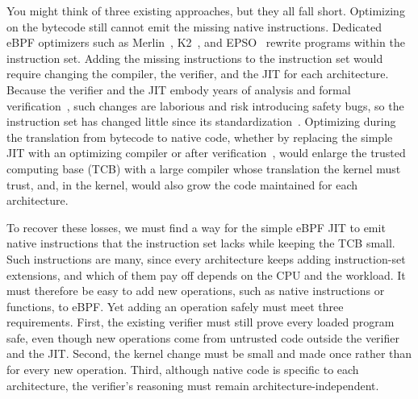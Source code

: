 You might think of three existing approaches, but they all fall short.
Optimizing on the bytecode still cannot emit the missing native instructions. Dedicated eBPF optimizers such as Merlin~\cite{mao2024merlin}, K2~\cite{xu2021synthesizing}, and EPSO~\cite{zhu2025epso} rewrite programs within the instruction set.
Adding the missing instructions to the instruction set would require changing the compiler, the verifier, and the JIT for each architecture. Because the verifier and the JIT embody years of analysis and formal verification~\cite{nelson2020specification,vishwanathan2023verifying}, such changes are laborious and risk introducing safety bugs, so the instruction set has changed little since its standardization~\cite{rfc9669}.
Optimizing during the translation from bytecode to native code, whether by replacing the simple JIT with an optimizing compiler or after verification~\cite{shahinfar2026fun}, would enlarge the trusted computing base (TCB) with a large compiler whose translation the kernel must trust, and, in the kernel, would also grow the code maintained for each architecture.

To recover these losses, we must find a way for the simple eBPF JIT to emit native instructions that the instruction set lacks while keeping the TCB small.
Such instructions are many, since every architecture keeps adding instruction-set extensions, and which of them pay off depends on the CPU and the workload.
It must therefore be easy to add new operations, such as native instructions or functions, to eBPF.
Yet adding an operation safely must meet three requirements. First, the existing verifier must still prove every loaded program safe, even though new operations come from untrusted code outside the verifier and the JIT. Second, the kernel change must be small and made once rather than for every new operation. Third, although native code is specific to each architecture, the verifier's reasoning must remain architecture-independent.

